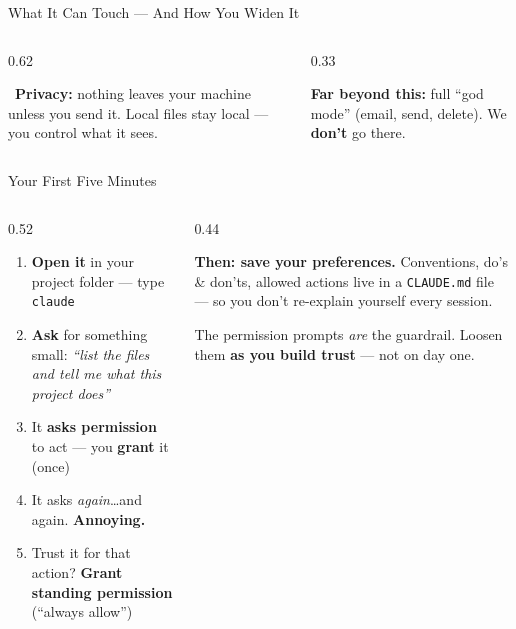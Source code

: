 \documentclass[aspectratio=169, 10pt]{beamer}
\begin{document}
\begin{frame}{What It Can Touch --- And How You Widen It}
\vskip2pt
\begin{columns}[T,onlytextwidth]
\begin{column}{0.62\textwidth}
\begin{tcolorbox}[accentbox, top=3pt, bottom=3pt]
\small \faLock\;\, \textbf{Privacy:} nothing leaves your machine unless you send it. Local files stay local --- you control what it sees.
\end{tcolorbox}
\end{column}
\begin{column}{0.33\textwidth}
\begin{tcolorbox}[colback=SoftCoral!8, colframe=SoftCoral!60, boxrule=0.5pt, arc=3pt, left=5pt, right=5pt, top=3pt, bottom=3pt]
\scriptsize \textbf{\color{SoftCoral}Far beyond this:} full ``god mode'' (email, send, delete). We \textbf{don't} go there.
\end{tcolorbox}
\end{column}
\end{columns}
\end{frame}

\begin{frame}[fragile]{Your First Five Minutes}
\vskip2pt
\begin{columns}[T]
\begin{column}{0.52\textwidth}
\begin{tcolorbox}[keybox, title={\faPlay\quad The loop everyone starts with}, top=3pt, bottom=3pt]
\small
\begin{enumerate}\setlength{\itemsep}{4pt}
  \item \textbf{Open it} in your project folder --- type \texttt{claude}
  \item \textbf{Ask} for something small: \textit{``list the files and tell me what this project does''}
  \item It \textbf{asks permission} to act --- you \textbf{grant} it (once)
  \item It asks \textit{again}\ldots and again. \textbf{Annoying.}
  \item Trust it for that action? \textbf{Grant standing permission} (``always allow'')
\end{enumerate}
\end{tcolorbox}
\end{column}
\begin{column}{0.44\textwidth}
\begin{tcolorbox}[accentbox, top=3pt, bottom=3pt]
\small
\textbf{Then: save your preferences.}
\vskip3pt
Conventions, do's \& don'ts, allowed actions live in a \texttt{CLAUDE.md} file --- so you don't re-explain yourself every session.
\end{tcolorbox}
\vskip4pt
\begin{tcolorbox}[quotebox, top=3pt, bottom=3pt]
\scriptsize The permission prompts \emph{are} the guardrail. Loosen them \textbf{as you build trust} --- not on day one.
\end{tcolorbox}
\end{column}
\end{columns}
\end{frame}
\end{document}
